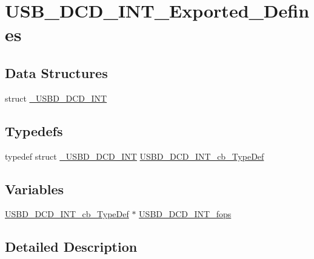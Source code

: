 \hypertarget{group___u_s_b___d_c_d___i_n_t___exported___defines}{\section{U\-S\-B\-\_\-\-D\-C\-D\-\_\-\-I\-N\-T\-\_\-\-Exported\-\_\-\-Defines}
\label{group___u_s_b___d_c_d___i_n_t___exported___defines}
}
\subsection*{Data Structures}
\begin{DoxyCompactItemize}
\item 
struct \hyperlink{struct___u_s_b_d___d_c_d___i_n_t}{\-\_\-\-U\-S\-B\-D\-\_\-\-D\-C\-D\-\_\-\-I\-N\-T}
\end{DoxyCompactItemize}
\subsection*{Typedefs}
\begin{DoxyCompactItemize}
\item 
typedef struct \hyperlink{struct___u_s_b_d___d_c_d___i_n_t}{\-\_\-\-U\-S\-B\-D\-\_\-\-D\-C\-D\-\_\-\-I\-N\-T} \hyperlink{group___u_s_b___d_c_d___i_n_t___exported___defines_ga971addf3787c238bd9c4edc038f5e26a}{U\-S\-B\-D\-\_\-\-D\-C\-D\-\_\-\-I\-N\-T\-\_\-cb\-\_\-\-Type\-Def}
\end{DoxyCompactItemize}
\subsection*{Variables}
\begin{DoxyCompactItemize}
\item 
\hyperlink{group___u_s_b___d_c_d___i_n_t___exported___defines_ga971addf3787c238bd9c4edc038f5e26a}{U\-S\-B\-D\-\_\-\-D\-C\-D\-\_\-\-I\-N\-T\-\_\-cb\-\_\-\-Type\-Def} $\ast$ \hyperlink{group___u_s_b___d_c_d___i_n_t___exported___defines_ga130d6cc1f53470f46f6c322169ef6b7d}{U\-S\-B\-D\-\_\-\-D\-C\-D\-\_\-\-I\-N\-T\-\_\-fops}
\end{DoxyCompactItemize}


\subsection{Detailed Description}



